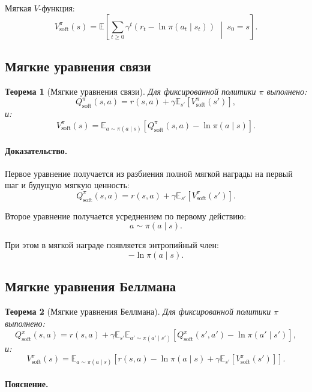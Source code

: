 \documentclass[12pt,a4paper]{article}
\newtheorem{theorem}{Теорема}
\begin{document}
Мягкая $V$-функция:
\[
V^\pi_{\mathrm{soft}}(s)
=
\mathbb E
\left[
\sum_{t\ge 0}
\gamma^t
\left(
r_t-\ln\pi(a_t\mid s_t)
\right)
\;\middle|\;
s_0=s
\right].
\]

\subsection{Мягкие уравнения связи}

\begin{theorem}[Мягкие уравнения связи]
Для фиксированной политики $\pi$ выполнено:
\[
Q^\pi_{\mathrm{soft}}(s,a)
=
r(s,a)
+
\gamma
\mathbb E_{s'}
\left[
V^\pi_{\mathrm{soft}}(s')
\right],
\]
и:
\[
V^\pi_{\mathrm{soft}}(s)
=
\mathbb E_{a\sim\pi(a\mid s)}
\left[
Q^\pi_{\mathrm{soft}}(s,a)
-
\ln \pi(a\mid s)
\right].
\]
\end{theorem}

\paragraph{Доказательство.}

Первое уравнение получается из разбиения полной мягкой награды на первый шаг и будущую мягкую ценность:
\[
Q^\pi_{\mathrm{soft}}(s,a)
=
r(s,a)
+
\gamma
\mathbb E_{s'}
\left[
V^\pi_{\mathrm{soft}}(s')
\right].
\]

Второе уравнение получается усреднением по первому действию:
\[
a\sim\pi(a\mid s).
\]

При этом в мягкой награде появляется энтропийный член:
\[
-\ln\pi(a\mid s).
\]

\subsection{Мягкие уравнения Беллмана}

\begin{theorem}[Мягкие уравнения Беллмана]
Для фиксированной политики $\pi$ выполнено:
\[
Q^\pi_{\mathrm{soft}}(s,a)
=
r(s,a)
+
\gamma
\mathbb E_{s'}
\mathbb E_{a'\sim\pi(a'\mid s')}
\left[
Q^\pi_{\mathrm{soft}}(s',a')
-
\ln\pi(a'\mid s')
\right],
\]
и:
\[
V^\pi_{\mathrm{soft}}(s)
=
\mathbb E_{a\sim\pi(a\mid s)}
\left[
r(s,a)
-
\ln\pi(a\mid s)
+
\gamma
\mathbb E_{s'}
\left[
V^\pi_{\mathrm{soft}}(s')
\right]
\right].
\]
\end{theorem}

\paragraph{Пояснение.}
\end{document}
